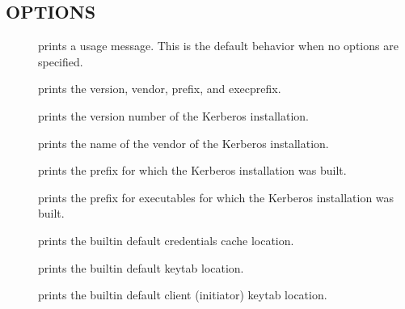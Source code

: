 \documentclass[letterpaper,10pt,english]{sphinxmanual}
\begin{document}
\subsection{OPTIONS}
\label{\detokenize{user/user_commands/krb5-config:options}}\begin{description}
\item[{\sphinxstylestrong{\sphinxhyphen{}}}] \leavevmode
\sphinxAtStartPar
prints a usage message.  This is the default behavior when no options
are specified.

\item[{\sphinxstylestrong{\sphinxhyphen{}}}] \leavevmode
\sphinxAtStartPar
prints the version, vendor, prefix, and exec\sphinxhyphen{}prefix.

\item[{\sphinxstylestrong{\sphinxhyphen{}}}] \leavevmode
\sphinxAtStartPar
prints the version number of the Kerberos installation.

\item[{\sphinxstylestrong{\sphinxhyphen{}}}] \leavevmode
\sphinxAtStartPar
prints the name of the vendor of the Kerberos installation.

\item[{\sphinxstylestrong{\sphinxhyphen{}}}] \leavevmode
\sphinxAtStartPar
prints the prefix for which the Kerberos installation was built.

\item[{\sphinxstylestrong{\sphinxhyphen{}}}] \leavevmode
\sphinxAtStartPar
prints the prefix for executables for which the Kerberos installation
was built.

\item[{\sphinxstylestrong{\sphinxhyphen{}}}] \leavevmode
\sphinxAtStartPar
prints the built\sphinxhyphen{}in default credentials cache location.

\item[{\sphinxstylestrong{\sphinxhyphen{}}}] \leavevmode
\sphinxAtStartPar
prints the built\sphinxhyphen{}in default keytab location.

\item[{\sphinxstylestrong{\sphinxhyphen{}}}] \leavevmode
\sphinxAtStartPar
prints the built\sphinxhyphen{}in default client (initiator) keytab location.


\end{description}
\end{document}
